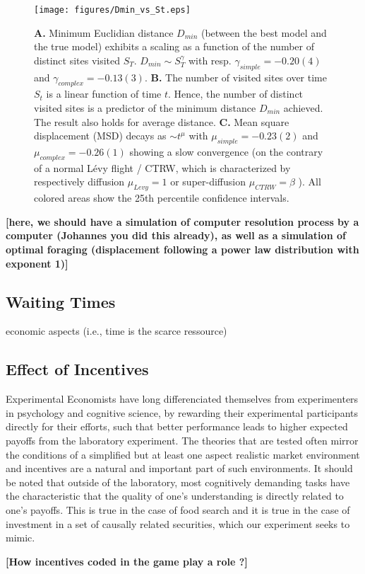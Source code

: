 \begin{figure}[h!]
\begin{center}
\texttt{[image: figures/Dmin\_vs\_St.eps]}
\caption{{\bf A.} Minimum Euclidian distance $D_{min}$ (between the best model and the true model) exhibits a scaling as a function of the number of distinct sites visited $S_{T}$. $D_{min} \sim S_{T}^{\gamma}$ with resp. $\gamma_{simple} = -0.20(4)$ and $\gamma_{complex} = - 0.13(3)$. {\bf B.}  The number of visited sites over time $S_t$ is a linear function of time $t$. Hence, the number of distinct visited sites is a predictor of the minimum distance $D_{min}$ achieved. The result also holds for average distance. {\bf C.}  Mean square displacement (MSD) decays as $\sim t^{\mu}$ with $\mu_{simple} =-0.23(2)$ and $\mu_{complex} =- 0.26(1)$ showing a slow convergence (on the contrary of a normal L\'evy flight / CTRW, which is characterized by respectively diffusion $\mu_{Levy} = 1$ or super-diffusion $\mu_{CTRW} = \beta$ \cite{21,23}). All colored areas show the 25th percentile confidence intervals.}
\label{fig:Dmin_vs_St}
\end{center}
\end{figure}


{\bf [here, we should have a simulation of computer resolution process by a computer (Johannes you did this already), as well as a simulation of optimal foraging (displacement following a power law distribution with exponent 1)]}


\subsection{Waiting Times}

economic aspects (i.e., time is the scarce ressource)

\subsection{Effect of Incentives}

Experimental Economists have long differenciated themselves from experimenters in psychology and cognitive science, by rewarding their experimental participants directly for their efforts, such that better performance leads to higher expected payoffs from the laboratory experiment. The theories that are tested often mirror the conditions of a simplified but at least one aspect realistic market environment and incentives are a natural and important part of such environments. It should be noted that outside of the laboratory, most cognitively demanding tasks have the characteristic that the quality of one's understanding is directly related to one's payoffs. This is true in the case of food search and it is true in the case of investment in a set of causally related securities, which our experiment seeks to mimic.     


{\bf [How incentives coded in the game play a role ?]}
